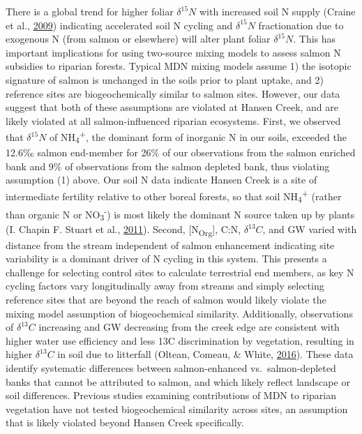 \documentclass [11pt, proquest] {uwthesis}[2015/03/03]
\begin{document}
There is a global trend for higher foliar \(\delta^{15}N\) with
increased soil N supply (Craine et al.,
\protect\hyperlink{ref-Craine2009}{2009}) indicating accelerated soil N
cycling and \(\delta^{15}N\) fractionation due to exogenous N (from
salmon or elsewhere) will alter plant foliar \(\delta^{15}N\). This has
important implications for using two-source mixing models to assess
salmon N subsidies to riparian forests. Typical MDN mixing models assume
1) the isotopic signature of salmon is unchanged in the soils prior to
plant uptake, and 2) reference sites are biogeochemically similar to
salmon sites. However, our data suggest that both of these assumptions
are violated at Hansen Creek, and are likely violated at all
salmon-influenced riparian ecosystems. First, we observed that
\(\delta^{15}N\) of NH\textsubscript{4}\textsuperscript{+}, the dominant
form of inorganic N in our soils, exceeded the 12.6‰ salmon end-member
for 26\% of our observations from the salmon enriched bank and 9\% of
observations from the salmon depleted bank, thus violating assumption
(1) above. Our soil N data indicate Hansen Creek is a site of
intermediate fertility relative to other boreal forests, so that soil
NH\textsubscript{4}\textsuperscript{+} (rather than organic N or
NO\textsubscript{3}\textsuperscript{-}) is most likely the dominant N
source taken up by plants (I. Chapin F. Stuart et al.,
\protect\hyperlink{ref-Chapin2011}{2011}). Second,
{[}N\textsubscript{Org}{]}, C:N, \(\delta^{13}C\), and GW varied with
distance from the stream independent of salmon enhancement indicating
site variability is a dominant driver of N cycling in this system. This
presents a challenge for selecting control sites to calculate
terrestrial end members, as key N cycling factors vary longitudinally
away from streams and simply selecting reference sites that are beyond
the reach of salmon would likely violate the mixing model assumption of
biogeochemical similarity. Additionally, observations of
\(\delta^{13}C\) increasing and GW decreasing from the creek edge are
consistent with higher water use efficiency and less 13C discrimination
by vegetation, resulting in higher \(\delta^{13}C\) in soil due to
litterfall (Oltean, Comeau, \& White,
\protect\hyperlink{ref-Oltean2016}{2016}). These data identify
systematic differences between salmon-enhanced vs.~salmon-depleted banks
that cannot be attributed to salmon, and which likely reflect landscape
or soil differences. Previous studies examining contributions of MDN to
riparian vegetation have not tested biogeochemical similarity across
sites, an assumption that is likely violated beyond Hansen Creek
specifically.
\end{document}
